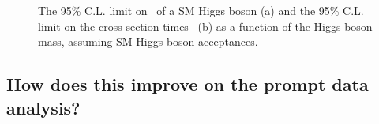\begin{figure}
  \begin{center}

 \caption{The 95\% C.L. limit on \BRinv\, of a SM Higgs boson (a) and the 95\% C.L. limit on the cross section times \BRinv\, (b) as a function of the Higgs boson mass, assuming SM Higgs boson acceptances.}%
    \label{fig:parkedlimits}
  \end{center}
\end{figure}


\subsection{How does this improve on the prompt data analysis?}




